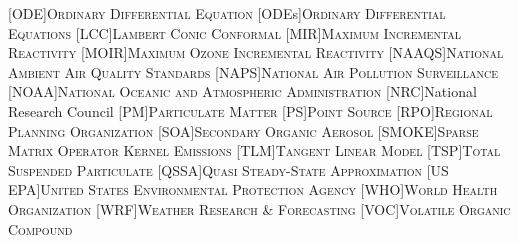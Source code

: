 \begin{acronym}
	[ODE]{\textsc{Ordinary Differential Equation}}
	[ODEs]{\textsc{Ordinary Differential Equations}}
	[LCC]{\textsc{Lambert Conic Conformal}}
	[MIR]{\textsc{Maximum Incremental Reactivity}}
	[MOIR]{\textsc{Maximum Ozone Incremental Reactivity}}
	[NAAQS]{\textsc{National Ambient Air Quality Standards}}
	[NAPS]{\textsc{National Air Pollution Surveillance}}
	[NOAA]{\textsc{National Oceanic and Atmospheric Administration}}
	[NRC]{National Research Council}
	[PM]{\textsc{Particulate Matter}}
	[PS]{\textsc{Point Source}}
	[RPO]{\textsc{Regional Planning Organization}}
	[SOA]{\textsc{Secondary Organic Aerosol}}
	[SMOKE]{\textsc{Sparse Matrix Operator Kernel Emissions}}
	[TLM]{\textsc{Tangent Linear Model}}
	[TSP]{\textsc{Total Suspended Particulate}}
	[QSSA]{\textsc{Quasi Steady-State Approximation}}
	[US EPA]{\textsc{United States Environmental Protection Agency}}
	[WHO]{\textsc{World Health Organization}}
	[WRF]{\textsc{Weather Research \& Forecasting}}
	[VOC]{\textsc{Volatile Organic Compound}}
\end{acronym}
\doublespace
